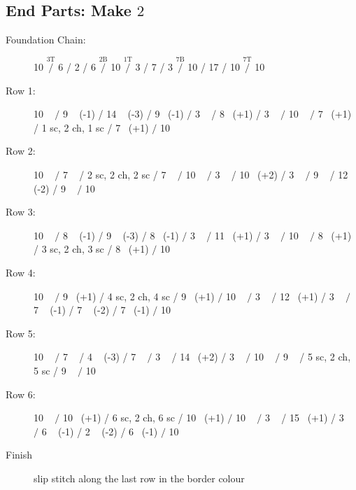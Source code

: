 \documentclass[openany]{book}
\newcommand{\ch}{}%
\renewcommand{\sc}{}%
\newcommand{\m}[1]{$\stackrel{{\text{#1}}}{/}$}
\begin{document}
\subsection*{End Parts: Make $2$}
\begin{description}
\item[Foundation Chain:]
10 \ch \m{3T}
6 \ch /  2 \ch /  6 \m{2B}
10 \ch \m{1T}
3 \ch / 7 \ch / 3 \ch \m{7B}
10 \ch / 17 \ch / 10 \m{7T}
10 \ch 
\item[Row 1:]
10 \sc~ \m{}
9 \sc~ (-1)  /  14 \sc~ (-3)  /  9 \sc~(-1) \m{}
3 \sc~ / 8 \sc~(+1) / 3 \sc~ \m{}
10 \sc~ \m{}
7 \sc~(+1) /  1 sc, 2 ch, 1 sc /  7 \sc~(+1) \m{}
10 \sc~ 
\item[Row 2:]
10 \sc~ \m{}
7 \sc~ /  2 sc, 2 ch, 2 sc /  7 \sc~ \m{}
10 \sc~ \m{}
3 \sc~ / 10 \sc~(+2) / 3 \sc~ \m{}
9 \sc~   /  12 \sc~ (-2)  /  9 \sc~ \m{}
10 \sc~ 
\item[Row 3:]
10 \sc~ \m{}
8 \sc~ (-1)  /  9 \sc~ (-3)  /  8 \sc~(-1) \m{}
3 \sc~ / 11 \sc~(+1) / 3 \sc~ \m{}
10 \sc~ \m{}
8 \sc~(+1) /  3 sc, 2 ch, 3 sc /  8 \sc~(+1) \m{}
10 \sc~ 
\item[Row 4:]
10 \sc~ \m{}
9 \sc~(+1) /  4 sc, 2 ch, 4 sc /  9 \sc~(+1) \m{}
10 \sc~ \m{}
3 \sc~ / 12 \sc~(+1) / 3 \sc~ \m{}
7 \sc~ (-1)  /  7 \sc~ (-2)  /  7 \sc~(-1) \m{}
10 \sc~ 
\item[Row 5:]
10 \sc~ \m{}
7 \sc~   /  4 \sc~ (-3)  /  7 \sc~ \m{}
3 \sc~ / 14 \sc~(+2) / 3 \sc~ \m{}
10 \sc~ \m{}
9 \sc~ /  5 sc, 2 ch, 5 sc /  9 \sc~ \m{}
10 \sc~ 
\item[Row 6:]
10 \sc~ \m{}
10 \sc~(+1) /  6 sc, 2 ch, 6 sc /  10 \sc~(+1) \m{}
10 \sc~ \m{}
3 \sc~ / 15 \sc~(+1) / 3 \sc~ \m{}
6 \sc~ (-1)  /  2 \sc~ (-2)  /  6 \sc~(-1) \m{}
10 \sc~ 
\item[Finish] slip stitch along the last row in the border colour
\end{description}
\end{document}

